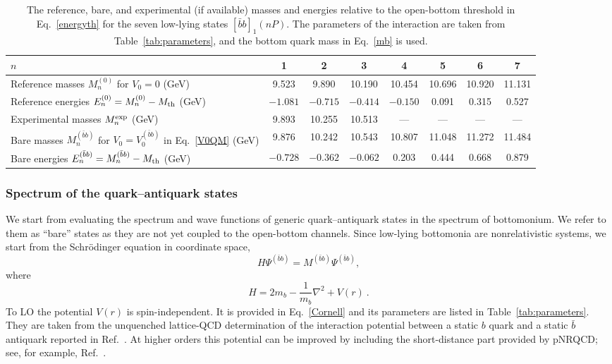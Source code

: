 \documentclass[aps,prd,showpacs,amsmath,twocolumn,superscriptaddress,floatfix,nofootinbib,notitlepage]{revtex4-2}
\newcommand{\bbnP}{[\bar{b}b]_1(nP)}
\newcommand{\psibb}{\Psi^{(\bar{b}b)}}
\newcommand{\Mbb}{M^{(\bar{b}b)}}
\newcommand{\be}{\begin{equation}}
\newcommand{\ee}{\end{equation}}
\newcommand{\QQ}{\bar{b}b}
\newcommand{\hatH}{H}
\begin{document}
\begin{table}[t!]
\caption{The reference, bare, and experimental (if available) masses and energies relative to the open-bottom threshold in Eq.~\eqref{energyth} for the seven low-lying states $\bbnP$. The parameters of the interaction are taken from Table~\ref{tab:parameters}, and the bottom quark mass in Eq.~\eqref{mb} is used.
}
\label{tab:bottom}
\begin{ruledtabular}
\begin{tabular}{lccccccc}
$n$ & 1 & 2 & 3 & 4 & 5 & 6 & 7 \\
\hline
Reference masses $M_n^{(0)}$ for $V_0=0$ (GeV)
& 9.523 & 9.890 & 10.190 & 10.454 & 10.696 & 10.920 &
11.131 \\
Reference energies $E_n^{(0)}=M_n^{(0)}-M_{\rm th}$ (GeV)
& $-1.081$ & $-0.715$ & $-0.414$ & $-0.150$ & 0.091 & 0.315 &
0.527\\
\hline
\vphantom{$\Bigl[$}Experimental masses $M_n^{\rm exp}$ (GeV) \cite{ParticleDataGroup:2026mpi}
& 9.893 & 10.255 & 10.513 & --- & --- & --- & --- \\
\hline
Bare masses $\Mbb_n$ for $V_0=V_0^{(\QQ)}$ in Eq.~\eqref{V0QM} (GeV)
& 9.876 & 10.242 & 10.543 & 10.807 & 11.048 & 11.272 &
11.484 \\
Bare energies $E_n^{(\QQ)}=\Mbb_n-M_{\rm th}$ (GeV)
& $-0.728$ & $-0.362$ & $-0.062$ & 0.203 & 0.444 & 0.668 &
0.879 \\
\end{tabular}
\end{ruledtabular}
\end{table}

\subsubsection{Spectrum of the quark--antiquark states}
\label{sec:qmstates}

We start from evaluating the spectrum and wave functions of generic quark--antiquark states in the spectrum of bottomonium. We refer to them as ``bare'' states as they are not yet coupled to the open-bottom channels.
Since low-lying bottomonia are nonrelativistic systems, we start from the Schr{\"o}dinger equation in coordinate space,
\be
\hatH\psibb=\Mbb\psibb,
\label{Scheq}
\ee
where
\be
\hatH=2m_b-\frac{1}{m_b}\nabla^{2}+V(r) \ .
\label{H0}
\ee
To LO the potential
$V(r)$ is spin-independent.
It
 is provided in Eq.~\eqref{Cornell} and its parameters are listed in Table~\ref{tab:parameters}. They are taken from the unquenched lattice-QCD determination of the interaction potential between a static $b$ quark and a static $\bar{b}$ antiquark reported in Ref.~\cite{Bulava:2024jpj}. 
 At higher orders this potential can be improved by including the short-distance part provided by pNRQCD; see, for example, Ref.~\cite{Brambilla:2024imu}.
 
\end{document}

